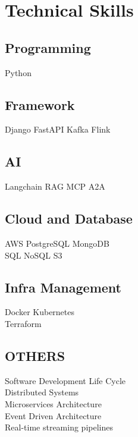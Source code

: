 \documentclass[]{deedy-resume-openfont}
\begin{document}
\begin{minipage}[t]{0.33\textwidth}
\section{Technical Skills}
\subsection{Programming}
\textbullet{} Python \\
\vspace{3mm}
\subsection{Framework}
\textbullet{} Django \textbullet{} FastAPI
\textbullet{} Kafka \textbullet{} Flink \\ 
\vspace{3mm}
\subsection{AI}
\textbullet{} Langchain  \textbullet{} RAG
\textbullet{} MCP \textbullet{} A2A   \\ 
\vspace{3mm}
\subsection{Cloud and Database}
\textbullet{} AWS \textbullet{} PostgreSQL \textbullet{} MongoDB \\ 
\textbullet{} SQL \textbullet{} NoSQL  \textbullet{} S3 \\
\vspace{3mm}
\subsection{Infra Management}
\textbullet{} Docker \textbullet{} Kubernetes \\
\textbullet{} Terraform \\
\vspace{4mm}
\subsection{OTHERS}
\textbullet{} Software Development Life Cycle  \\
\textbullet{} Distributed Systems \\
\textbullet{} Microservices  Architecture \\
\textbullet{} Event Driven Architecture \\
\textbullet{} Real-time streaming pipelines




\end{minipage}
\end{document}
